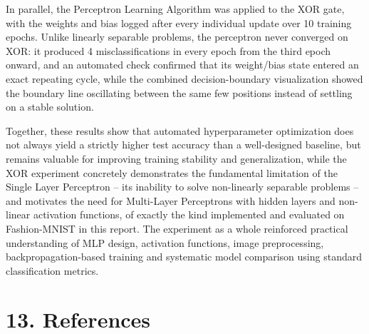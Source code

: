 \documentclass[11pt,a4paper]{article}
\begin{document}
In parallel, the Perceptron Learning Algorithm was applied to the XOR gate, with the weights and bias logged after every individual update over 10 training epochs. Unlike linearly separable problems, the perceptron never converged on XOR: it produced 4 misclassifications in every epoch from the third epoch onward, and an automated check confirmed that its weight/bias state entered an exact repeating cycle, while the combined decision-boundary visualization showed the boundary line oscillating between the same few positions instead of settling on a stable solution.

Together, these results show that automated hyperparameter optimization does not always yield a strictly higher test accuracy than a well-designed baseline, but remains valuable for improving training stability and generalization, while the XOR experiment concretely demonstrates the fundamental limitation of the Single Layer Perceptron -- its inability to solve non-linearly separable problems -- and motivates the need for Multi-Layer Perceptrons with hidden layers and non-linear activation functions, of exactly the kind implemented and evaluated on Fashion-MNIST in this report. The experiment as a whole reinforced practical understanding of MLP design, activation functions, image preprocessing, backpropagation-based training and systematic model comparison using standard classification metrics.
\section*{13. References}
\end{document}
